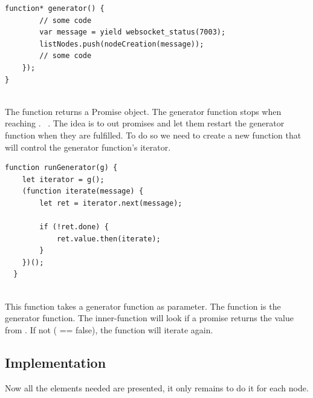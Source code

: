 \documentclass[11pt, a4paper, twoside, openright]{book} %
\begin{document}
\begin{lstlisting}[caption={Extract from the project's code}, captionpos=b]
  function* generator() {
        // some code
        var message = yield websocket_status(7003);
        listNodes.push(nodeCreation(message));
        // some code
    });
}
\end{lstlisting}
\leavevmode \\
The function  returns a Promise object. The generator function
stops when reaching . ~\cite{runGenerator}.
The idea is to  out promises and let them restart the generator function when
they are fulfilled. To do so we need to create a new function that will control the generator function's iterator.\\
\begin{lstlisting}[caption={Extract from the project's code~\cite{runGenerator}}, captionpos=b]
  function runGenerator(g) {
    let iterator = g();
    (function iterate(message) {
        let ret = iterator.next(message);

        if (!ret.done) {
            ret.value.then(iterate);
        }
    })();
  }
\end{lstlisting}
\leavevmode \\
This function takes a generator function as parameter. The  function
is the generator function. The inner-function  will look if a promise
returns the value  from . If not ( == false), the function
will iterate again.\\

\subsection{Implementation}
Now all the elements needed are presented, it only remains to do it for each node.\\
\end{document}
